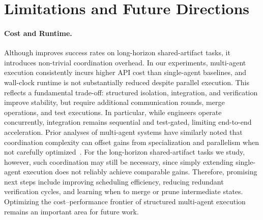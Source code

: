 \section{Limitations and Future Directions}
\label{sec:limitations-fur-dir}

\paragraph{Cost and Runtime.}
Although \ourmethod improves success rates on long-horizon shared-artifact tasks, it introduces non-trivial coordination overhead. In our experiments, multi-agent execution consistently incurs higher API cost than single-agent baselines, and wall-clock runtime is not substantially reduced despite parallel execution. This reflects a fundamental trade-off: structured isolation, integration, and verification improve stability, but require additional communication rounds, merge operations, and test executions. In particular, while engineers operate concurrently, integration remains sequential and test-gated, limiting end-to-end acceleration. Prior analyses of multi-agent systems have similarly noted that coordination complexity can offset gains from specialization and parallelism when not carefully optimized~\citep{oreilly2024multiagent}. For the long-horizon shared-artifact tasks we study, however, such coordination may still be necessary, since simply extending single-agent execution does not reliably achieve comparable gains. Therefore, promising next steps include improving scheduling efficiency, reducing redundant verification cycles, and learning when to merge or prune intermediate states. Optimizing the cost–performance frontier of structured multi-agent execution remains an important area for future work. 




